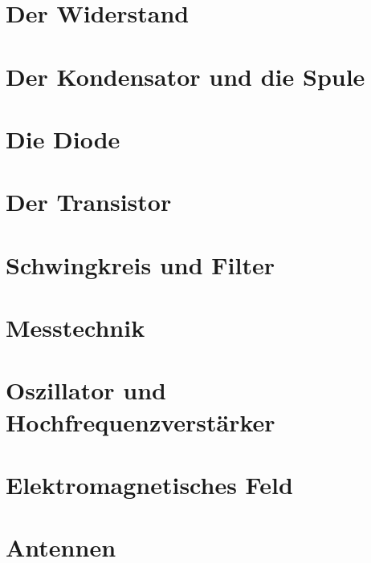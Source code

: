 \documentclass[ngerman,openany, oneside]{Script}
\begin{document}


\newpage

\chapter{Der Widerstand}


\chapter{Der Kondensator und die Spule}


\chapter{Die Diode}


\chapter{Der Transistor}


\chapter{Schwingkreis und Filter}


\chapter{Messtechnik}


\chapter{Oszillator und Hochfrequenzverstärker}


\chapter{Elektromagnetisches Feld}


\chapter{Antennen}



\end{document}
